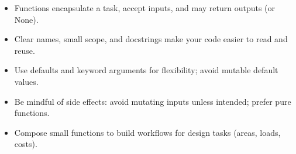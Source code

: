 \begin{tcolorbox}[%
    colframe=orange,
    colback = white,
    arc=2mm %
 ]
\begin{itemize}
  \item Functions encapsulate a task, accept inputs, and may return outputs (or None).
  \item Clear names, small scope, and docstrings make your code easier to read and reuse.
  \item Use defaults and keyword arguments for flexibility; avoid mutable default values.
  \item Be mindful of side effects: avoid mutating inputs unless intended; prefer pure functions.
  \item Compose small functions to build workflows for design tasks (areas, loads, costs).
\end{itemize}
\end{tcolorbox}
